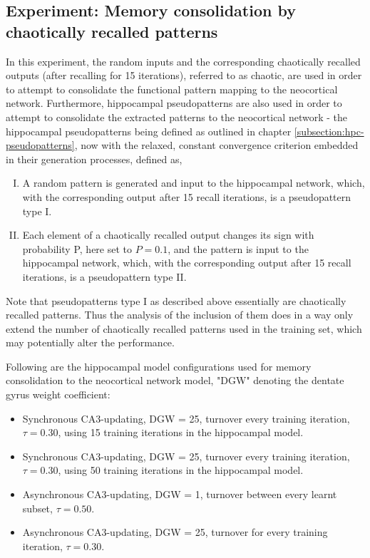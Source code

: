 \subsection{Experiment: Memory consolidation by chaotically recalled patterns}\label{subsect:rand-in-chaotic-out}

In this experiment, the random inputs and the corresponding chaotically recalled outputs (after recalling for 15 iterations), referred to as chaotic, are used in order to attempt to consolidate the functional pattern mapping to the neocortical network. Furthermore, hippocampal pseudopatterns are also used in order to attempt to consolidate the extracted patterns to the neocortical network - the hippocampal pseudopatterns being defined as outlined in chapter \ref{subsection:hpc-pseudopatterns}, now with the relaxed, constant convergence criterion embedded in their generation processes, defined as,

\begin{enumerate}[I.]
    \item A random pattern is generated and input to the hippocampal network, which, with the corresponding output after 15 recall iterations, is a pseudopattern type I.
    \item Each element of a chaotically recalled output changes its sign with probability P, here set to $P=0.1$, and the pattern is input to the hippocampal network, which, with the corresponding output after 15 recall iterations, is a pseudopattern type II.
\end{enumerate}

Note that pseudopatterns type I as described above essentially are chaotically recalled patterns. Thus the analysis of the inclusion of them does in a way only extend the number of chaotically recalled patterns used in the training set, which may potentially alter the performance.

Following are the hippocampal model configurations used for memory consolidation to the neocortical network model, "DGW" denoting the dentate gyrus weight coefficient:

\begin{itemize}
    \item Synchronous CA3-updating, DGW = 25, turnover every training iteration, $\tau=0.30$, using 15 training iterations in the hippocampal model.
    \item Synchronous CA3-updating, DGW = 25, turnover every training iteration, $\tau=0.30$, using 50 training iterations in the hippocampal model.
    \item Asynchronous CA3-updating, DGW = 1, turnover between every learnt subset, $\tau=0.50$.
    \item Asynchronous CA3-updating, DGW = 25, turnover for every training iteration, $\tau=0.30$.
\end{itemize}


